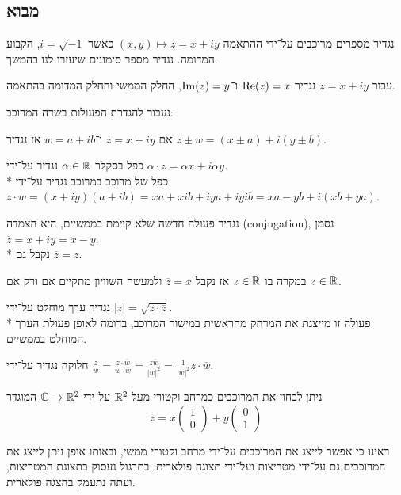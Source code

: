 \subsection{מבוא}
נגדיר מספרים מרוכבים על־ידי ההתאמה $(x, y) \mapsto z = x + i y$ כאשר $i = \sqrt{-1}$, הקבוע המדומה.
נגדיר מספר סימונים שיעזרו לנו בהמשך.
\begin{definition}
	עבור $z = x + iy$ נגדיר $\operatorname{Re}(z) = x$ ו־$\operatorname{Im}(z) = y$, החלק הממשי והחלק המדומה בהתאמה.
\end{definition}
נעבור להגדרת הפעולות בשדה המרוכב:
\begin{definition}
	אם $z = x + i y$ ו־$w = a + i b$ אז נגדיר $z \pm w = (x \pm a) + i (y \pm b)$.
\end{definition}
\begin{definition}[כפל]
	כפל בסקלר $\alpha \in \mathbb{R}$ נגדיר על־ידי $\alpha \cdot z = \alpha x + i \alpha y$. \\*
	כפל של מרוכב במרוכב נגדיר על־ידי $z \cdot w = (x + i y)(a + i b) = xa + xib + iya + iy ib = xa - yb + i(xb + ya)$.
\end{definition}
\begin{definition}[הצמדה]
	נגדיר פעולה חדשה שלא קיימת בממשיים, היא הצמדה (conjugation), נסמן $\overline{z} = \overline{x + iy} = x - y$. \\*
	נקבל גם $\overline{\overline{z}} = z$.
\end{definition}
במקרה בו $z \in \mathbb{R}$ אז נקבל $\overline{z} = x$ ולמעשה השוויון מתקיים אם ורק אם $z \in \mathbb{R}$.
\begin{definition}
	נגדיר ערך מוחלט על־ידי $|z| = \sqrt{z \cdot \overline{z}}$. \\*
	פעולה זו מייצגת את המרחק מהראשית במישור המרוכב, בדומה לאופן פעולת הערך המוחלט בממשיים.
\end{definition}
\begin{definition}[חלוקה]
	חלוקה נגדיר על־ידי $\frac{z}{w} = \frac{z \cdot \overline{w}}{w \cdot \overline{w}} = \frac{z \overline{w}}{{|w|}^2} = \frac{1}{{|w|}^2} z \cdot \overline{w}$.
\end{definition}
\begin{remark}
	ניתן לבחון את המרוכבים כמרחב וקטורי מעל $\mathbb{R}^2$ על־ידי $\mathbb{C} \to \mathbb{R}^2$ המוגדר
	\[
		z = x \begin{pmatrix} 1 \\ 0 \end{pmatrix} + y \begin{pmatrix} 0 \\ 1 \end{pmatrix}
	\]
\end{remark}
ראינו כי אפשר לייצג את המרוכבים על־ידי מרחב וקטורי ממשי, ובאותו אופן ניתן לייצג את המרוכבים גם על־ידי מטריצות ועל־ידי תצוגה פולארית. בתרגול נעסוק בתצוגת המטריצות, ועתה נתעמק בהצגה פולארית.

